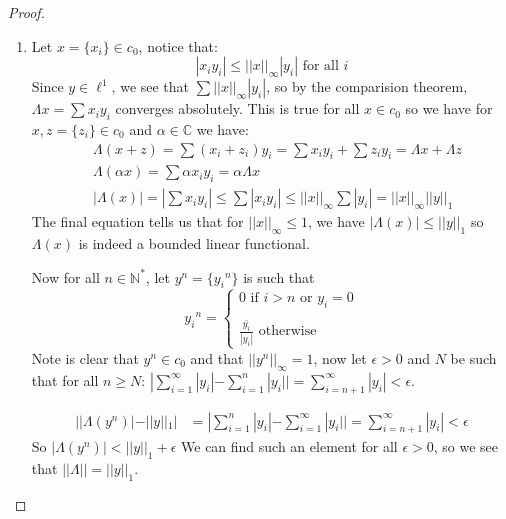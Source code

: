 \documentclass{article}
\newcommand{\C}{\mathbb{C}}
\newcommand{\N}{\mathbb{N}}
\theoremstyle{definition}
\theoremstyle{remark}
\theoremstyle{definition}
\begin{document}
    \begin{proof}
        \begin{enumerate}[label = (\alph*)]
            \item Let $x=\{x_i\}\in c_0$, notice that:\begin{equation}
                |{x_i}{y_i}|\leq ||x||_\infty |y_i| \text{ for all }i
            \end{equation}
            Since $y\in \ell^1$, we see that $\sum ||x||_\infty |y_i|$, so by the comparision theorem, $\Lambda x = \sum {x_i}{y_i}$ converges
            absolutely. This is true for all $x\in c_0$ so we have for $x, z=\{z_i\}\in c_0$ and $\alpha\in \C$ we have:\begin{align}
                &\Lambda(x+z) = \sum (x_i+z_i)y_i = \sum {x_i}{y_i} + \sum {z_i}{y_i} = \Lambda x + \Lambda z
                \\&\Lambda(\alpha x) = \sum \alpha {x_i}{y_i} = \alpha \Lambda x\\
                &|\Lambda(x)| = |\sum {x_i}{y_i}| \leq \sum |{x_i}{y_i}| \leq ||x||_\infty \sum|y_i| = ||x||_\infty ||y||_1
            \end{align}
            The final equation tells us that for $||x||_\infty\leq 1$, we have $|\Lambda(x)|\leq ||y||_1$ so $\Lambda(x)$ is indeed a bounded linear functional.

        Now for all $n\in \N^\ast$, let $y^n = \{{y_i}^n\}$ is such that \[{y_i}^n=\begin{cases}
            0 \text{ if }i>n\text{ or }y_i = 0\\
            \\
            \frac{\bar{y_i}}{|y_i|} \text{ otherwise }
        \end{cases}\]
    Note is clear that $y^n\in c_0$ and that $||y^n||_\infty = 1$, now let $\epsilon>0$ and $N$ be such that for all $n\geq N$: $|\sum_{i=1}^\infty |y_i| - \sum_{i=1}^n |y_i||=\sum_{i=n+1}^\infty |y_i|<\epsilon$.
    
    \begin{align}
        ||\Lambda(y^n)| - ||y||_1| &= |\sum_{i=1}^n |y_i| - \sum_{i=1}^\infty |y_i|| = \sum_{i=n+1}^\infty |y_i| < \epsilon
    \end{align}
    So $|\Lambda(y^n)| < ||y||_1+\epsilon$
    We can find such an element for all $\epsilon>0$, so we see that $||\Lambda|| = ||y||_1$.


\end{enumerate}
\end{proof}
\end{document}
